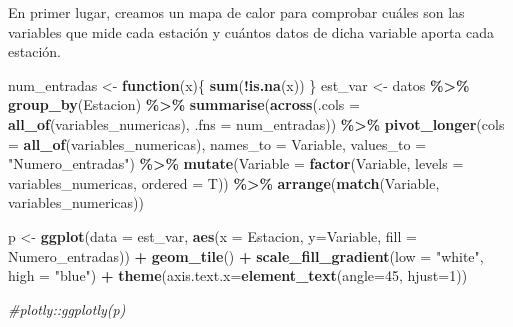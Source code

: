 \documentclass[notspecified,article,submit,moreauthors,pdftex]{Definitions/mdpi}
\newenvironment{Shaded}{\begin{snugshade}}{\end{snugshade}}
\newcommand{\AttributeTok}[1]{\textcolor[rgb]{0.13,0.29,0.53}{#1}}
\newcommand{\CommentTok}[1]{\textcolor[rgb]{0.56,0.35,0.01}{\textit{#1}}}
\newcommand{\ControlFlowTok}[1]{\textcolor[rgb]{0.13,0.29,0.53}{\textbf{#1}}}
\newcommand{\DecValTok}[1]{\textcolor[rgb]{0.00,0.00,0.81}{#1}}
\newcommand{\FunctionTok}[1]{\textcolor[rgb]{0.13,0.29,0.53}{\textbf{#1}}}
\newcommand{\NormalTok}[1]{#1}
\newcommand{\OtherTok}[1]{\textcolor[rgb]{0.56,0.35,0.01}{#1}}
\newcommand{\SpecialCharTok}[1]{\textcolor[rgb]{0.81,0.36,0.00}{\textbf{#1}}}
\newcommand{\StringTok}[1]{\textcolor[rgb]{0.31,0.60,0.02}{#1}}
\begin{document}
En primer lugar, creamos un mapa de calor para comprobar cuáles son las
variables que mide cada estación y cuántos datos de dicha variable
aporta cada estación.

\begin{Shaded}
\begin{Highlighting}[]
\NormalTok{num\_entradas }\OtherTok{\textless{}{-}} \ControlFlowTok{function}\NormalTok{(x)\{}
  \FunctionTok{sum}\NormalTok{(}\SpecialCharTok{!}\FunctionTok{is.na}\NormalTok{(x))}
\NormalTok{\}}
\NormalTok{est\_var }\OtherTok{\textless{}{-}}\NormalTok{ datos }\SpecialCharTok{\%\textgreater{}\%} 
  \FunctionTok{group\_by}\NormalTok{(Estacion) }\SpecialCharTok{\%\textgreater{}\%} 
  \FunctionTok{summarise}\NormalTok{(}\FunctionTok{across}\NormalTok{(}\AttributeTok{.cols =} \FunctionTok{all\_of}\NormalTok{(variables\_numericas), }\AttributeTok{.fns =}\NormalTok{ num\_entradas)) }\SpecialCharTok{\%\textgreater{}\%} 
  \FunctionTok{pivot\_longer}\NormalTok{(}\AttributeTok{cols =} \FunctionTok{all\_of}\NormalTok{(variables\_numericas), }\AttributeTok{names\_to =} \StringTok{\textquotesingle{}Variable\textquotesingle{}}\NormalTok{, }\AttributeTok{values\_to =} \StringTok{"Numero\_entradas"}\NormalTok{) }\SpecialCharTok{\%\textgreater{}\%}
  \FunctionTok{mutate}\NormalTok{(}\AttributeTok{Variable =} \FunctionTok{factor}\NormalTok{(Variable, }\AttributeTok{levels =}\NormalTok{ variables\_numericas, }\AttributeTok{ordered =}\NormalTok{ T)) }\SpecialCharTok{\%\textgreater{}\%} 
  \FunctionTok{arrange}\NormalTok{(}\FunctionTok{match}\NormalTok{(Variable, variables\_numericas))}

\NormalTok{p }\OtherTok{\textless{}{-}} \FunctionTok{ggplot}\NormalTok{(}\AttributeTok{data =}\NormalTok{ est\_var, }\FunctionTok{aes}\NormalTok{(}\AttributeTok{x =}\NormalTok{ Estacion, }\AttributeTok{y=}\NormalTok{Variable, }\AttributeTok{fill =}\NormalTok{ Numero\_entradas)) }\SpecialCharTok{+} 
  \FunctionTok{geom\_tile}\NormalTok{() }\SpecialCharTok{+} \FunctionTok{scale\_fill\_gradient}\NormalTok{(}\AttributeTok{low =} \StringTok{"white"}\NormalTok{, }\AttributeTok{high =} \StringTok{"blue"}\NormalTok{) }\SpecialCharTok{+} 
  \FunctionTok{theme}\NormalTok{(}\AttributeTok{axis.text.x=}\FunctionTok{element\_text}\NormalTok{(}\AttributeTok{angle=}\DecValTok{45}\NormalTok{, }\AttributeTok{hjust=}\DecValTok{1}\NormalTok{))}

\CommentTok{\#plotly::ggplotly(p)}
\end{Highlighting}
\end{Shaded}
\end{document}
